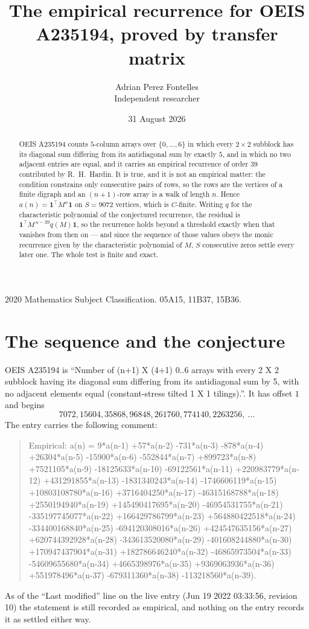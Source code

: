 \documentclass[11pt,a4paper]{article}
\title{The empirical recurrence for OEIS A235194, proved by transfer matrix}
\author{Adrian Perez Fontelles\\ \small Independent researcher}
\date{31 August 2026}
\theoremstyle{plain}
\theoremstyle{definition}
\begin{document}
\maketitle

\begin{abstract}
OEIS A235194 counts $5$-column arrays over $\{0,\dots,6\}$ in which every
$2\times2$ subblock has its diagonal sum differing from its antidiagonal sum by
exactly $5$, and in which no two adjacent entries are equal, and it
carries an empirical recurrence of order $39$ contributed by R.~H.~Hardin. It is true,
and it is not an empirical matter: the condition constrains only consecutive pairs of rows,
so the rows are the vertices of a finite digraph and an $(n+1)$-row array is a walk of
length $n$. Hence $a(n)=\mathbf{1}^{\!\top}M^{n}\mathbf{1}$ on $S=9072$ vertices, which
is $C$-finite. Writing $q$ for the characteristic polynomial of the conjectured recurrence,
the residual is $\mathbf{1}^{\!\top}M^{\,n-39}q(M)\mathbf{1}$, so the recurrence
holds beyond a threshold exactly when that vanishes from then on --- and since the sequence
of those values obeys the monic recurrence given by the characteristic polynomial of $M$,
$S$ consecutive zeros settle every later one. The whole test is finite and exact.
\end{abstract}

\noindent\small 2020 Mathematics Subject Classification. 05A15, 11B37, 15B36.\normalsize

\section{The sequence and the conjecture}

OEIS A235194 is ``Number of (n+1) X (4+1) 0..6 arrays with every 2 X 2 subblock having its diagonal sum differing from its antidiagonal sum by 5, with no adjacent elements equal (constant-stress tilted 1 X 1 tilings).''. It has offset
$1$ and begins
\[
7072, 15604, 35868, 96848, 261760, 774140, 2263256,\ \dots
\]
The entry carries the following comment:
\begin{quote}\small
Empirical: a(n) = 9*a(n-1) +57*a(n-2) -731*a(n-3) -878*a(n-4) +26304*a(n-5) -15900*a(n-6) -552844*a(n-7) +899723*a(n-8) +7521105*a(n-9) -18125633*a(n-10) -69122561*a(n-11) +220983779*a(n-12) +431291855*a(n-13) -1831340243*a(n-14) -1746606119*a(n-15) +10803108780*a(n-16) +3716404250*a(n-17) -46315168788*a(n-18) +2550194940*a(n-19) +145490417695*a(n-20) -46954531755*a(n-21) -335197745077*a(n-22) +166429786799*a(n-23) +564880422518*a(n-24) -334400168840*a(n-25) -694120308016*a(n-26) +424547635156*a(n-27) +620744392928*a(n-28) -343613520080*a(n-29) -401608244880*a(n-30) +170947437904*a(n-31) +182786646240*a(n-32) -46865973504*a(n-33) -54609655680*a(n-34) +4665398976*a(n-35) +9369063936*a(n-36) +551978496*a(n-37) -679311360*a(n-38) -113218560*a(n-39).
\end{quote}
As of the ``Last modified'' line on the live entry (Jun 19 2022 03:33:56, revision 10) the statement is
still recorded as empirical, and nothing on the entry records it as settled either way.
\end{document}
